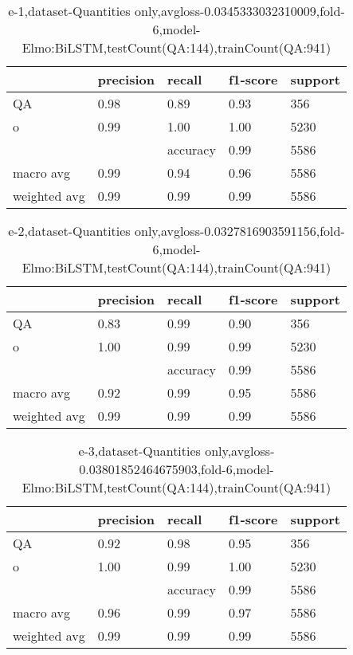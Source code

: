 \begin{table}[!ht] 
\centering
\caption{e-1,dataset-Quantities only,avgloss-0.0345333032310009,fold-6,model-Elmo:BiLSTM,testCount(QA:144),trainCount(QA:941)}\label{e-1data-quantS.tsv}
\begin{tabularx}{300pt}{|X|X|X|X|X|}
\hline
&precision&recall&f1-score&support\\
\hline
QA&0.98&0.89&0.93&356\\
\hline
o&0.99&1.00&1.00&5230\\
\hline
&&accuracy&0.99&5586\\
\hline
macro avg&0.99&0.94&0.96&5586\\
\hline
weighted avg&0.99&0.99&0.99&5586\\
\hline
\end{tabularx}
\end{table}
\begin{table}[!ht] 
\centering
\caption{e-2,dataset-Quantities only,avgloss-0.0327816903591156,fold-6,model-Elmo:BiLSTM,testCount(QA:144),trainCount(QA:941)}\label{e-2data-quantS.tsv}
\begin{tabularx}{300pt}{|X|X|X|X|X|}
\hline
&precision&recall&f1-score&support\\
\hline
QA&0.83&0.99&0.90&356\\
\hline
o&1.00&0.99&0.99&5230\\
\hline
&&accuracy&0.99&5586\\
\hline
macro avg&0.92&0.99&0.95&5586\\
\hline
weighted avg&0.99&0.99&0.99&5586\\
\hline
\end{tabularx}
\end{table}
\begin{table}[!ht] 
\centering
\caption{e-3,dataset-Quantities only,avgloss-0.03801852464675903,fold-6,model-Elmo:BiLSTM,testCount(QA:144),trainCount(QA:941)}\label{e-3data-quantS.tsv}
\begin{tabularx}{300pt}{|X|X|X|X|X|}
\hline
&precision&recall&f1-score&support\\
\hline
QA&0.92&0.98&0.95&356\\
\hline
o&1.00&0.99&1.00&5230\\
\hline
&&accuracy&0.99&5586\\
\hline
macro avg&0.96&0.99&0.97&5586\\
\hline
weighted avg&0.99&0.99&0.99&5586\\
\hline
\end{tabularx}
\end{table}
